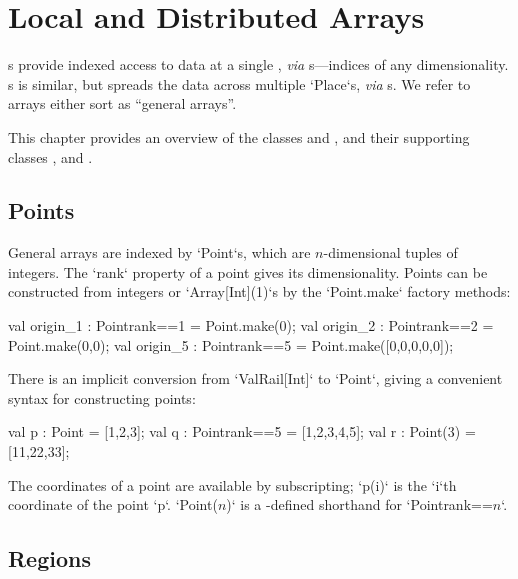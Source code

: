 \chapter{Local and Distributed Arrays}\label{XtenArrays}

s provide indexed access to data at a single , {\em via}
s---indices of any dimensionality. s is similar, but
spreads the data across multiple \xcd`Place`s, {\em via} s.  
We refer to arrays either sort as ``general arrays''.  


This chapter provides an overview of the  classes 
and , and their supporting classes , 
and .  


\section{Points}\label{point-syntax}


General arrays are indexed by \xcd`Point`s, which are $n$-dimensional tuples of
integers.  The \xcd`rank`
property of a point gives its dimensionality.  Points can be constructed from
integers or \xcd`Array[Int](1)`s by
the \xcd`Point.make` factory methods:
\begin{xten}
val origin_1 : Point{rank==1} = Point.make(0);
val origin_2 : Point{rank==2} = Point.make(0,0);
val origin_5 : Point{rank==5} = Point.make([0,0,0,0,0]);
\end{xten}

There is an implicit conversion from \xcd`ValRail[Int]` to 
\xcd`Point`, giving
a convenient syntax for constructing points: 

\begin{xten}
val p : Point = [1,2,3];
val q : Point{rank==5} = [1,2,3,4,5];
val r : Point(3) = [11,22,33];
\end{xten}

The coordinates of a point are available by subscripting; \xcd`p(i)` is the
\xcd`i`th coordinate of the point \xcd`p`. 
\xcdmath`Point($n$)` is a -defined shorthand  for 
\xcdmath`Point{rank==$n$}`.


\section{Regions}\label{XtenRegions}

